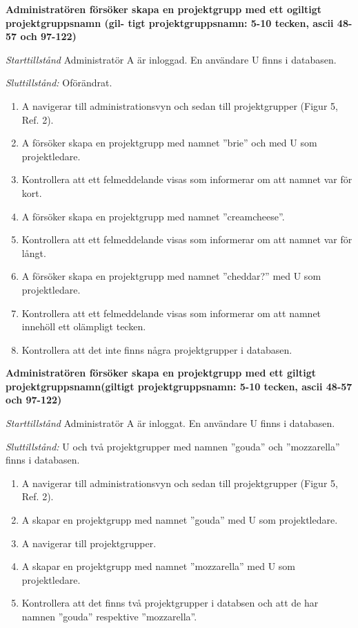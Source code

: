 \documentclass[a4paper]{article}
\begin{document}
\begin{FT}
\item
\textbf{Administratören försöker skapa en projektgrupp med ett ogiltigt projektgruppsnamn (gil- tigt projektgruppsnamn: 5-10 tecken, ascii 48-57 och 97-122)}

\emph{Starttillstånd} Administratör A  är inloggad. En användare U finns i databasen.

\emph{Sluttillstånd:} Oförändrat.

\begin{enumerate}
\item A navigerar till administrationsvyn och sedan till projektgrupper (Figur 5, Ref. 2).
\item A försöker skapa en projektgrupp med namnet ''brie'' och med U som projektledare.
\item Kontrollera att ett felmeddelande visas som informerar om att namnet var för kort.
\item A försöker skapa en projektgrupp med namnet ''creamcheese''.
\item Kontrollera att ett felmeddelande visas som informerar om att namnet var för långt.
\item A försöker skapa en projektgrupp med namnet ''cheddar?'' med U som projektledare.
\item Kontrollera att ett felmeddelande visas som informerar om att namnet innehöll ett olämpligt tecken.
\item Kontrollera att det inte finns några projektgrupper i databasen.

\end{enumerate}

\item
\textbf{Administratören försöker skapa en projektgrupp med ett giltigt projektgruppsnamn(giltigt projektgruppsnamn: 5-10 tecken, ascii 48-57 och 97-122)}

\emph{Starttillstånd} Administratör A  är inloggat. En användare U finns i databasen.

\emph{Sluttillstånd:} U och två projektgrupper med namnen ''gouda'' och ''mozzarella'' finns i databasen.

\begin{enumerate}
\item A navigerar till administrationsvyn och sedan till projektgrupper (Figur 5, Ref. 2).
\item A skapar en projektgrupp med namnet ''gouda'' med U som projektledare.
\item A navigerar till projektgrupper.
\item A skapar en projektgrupp med namnet ''mozzarella'' med U som projektledare.
\item Kontrollera att det finns två projektgrupper i databsen och att de har namnen ''gouda'' respektive ''mozzarella''.
\end{enumerate}


\end{FT}
\end{document}
